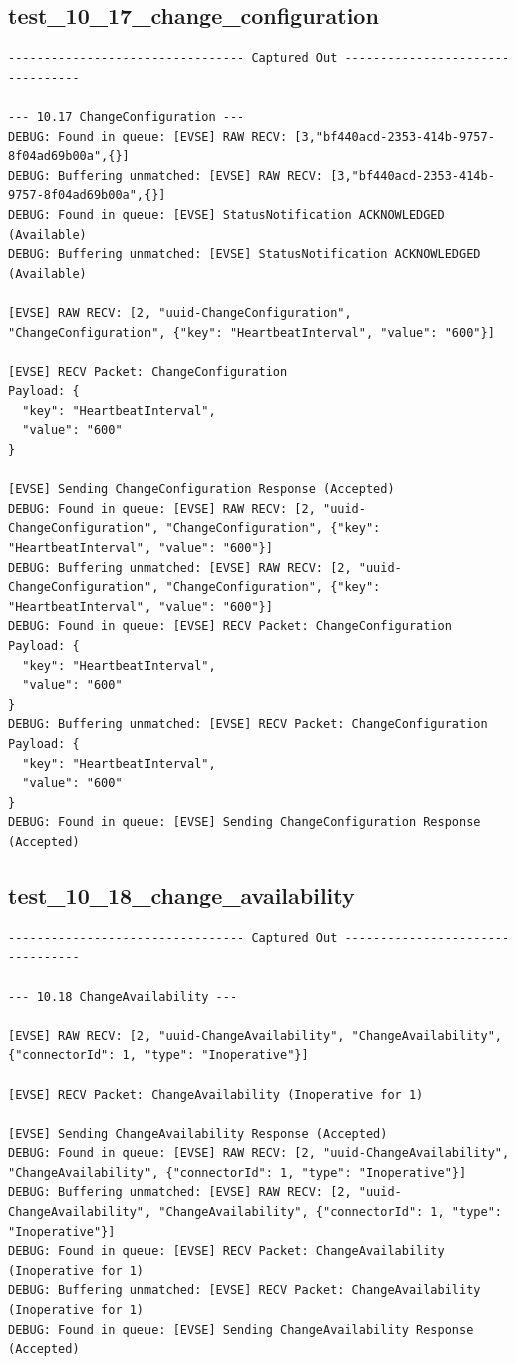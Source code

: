 \documentclass{article}
\begin{document}
\subsection*{test\_10\_17\_change\_configuration}
\begin{lstlisting}
--------------------------------- Captured Out ---------------------------------

--- 10.17 ChangeConfiguration ---
DEBUG: Found in queue: [EVSE] RAW RECV: [3,"bf440acd-2353-414b-9757-8f04ad69b00a",{}]
DEBUG: Buffering unmatched: [EVSE] RAW RECV: [3,"bf440acd-2353-414b-9757-8f04ad69b00a",{}]
DEBUG: Found in queue: [EVSE] StatusNotification ACKNOWLEDGED (Available)
DEBUG: Buffering unmatched: [EVSE] StatusNotification ACKNOWLEDGED (Available)

[EVSE] RAW RECV: [2, "uuid-ChangeConfiguration", "ChangeConfiguration", {"key": "HeartbeatInterval", "value": "600"}]

[EVSE] RECV Packet: ChangeConfiguration
Payload: {
  "key": "HeartbeatInterval",
  "value": "600"
}

[EVSE] Sending ChangeConfiguration Response (Accepted)
DEBUG: Found in queue: [EVSE] RAW RECV: [2, "uuid-ChangeConfiguration", "ChangeConfiguration", {"key": "HeartbeatInterval", "value": "600"}]
DEBUG: Buffering unmatched: [EVSE] RAW RECV: [2, "uuid-ChangeConfiguration", "ChangeConfiguration", {"key": "HeartbeatInterval", "value": "600"}]
DEBUG: Found in queue: [EVSE] RECV Packet: ChangeConfiguration
Payload: {
  "key": "HeartbeatInterval",
  "value": "600"
}
DEBUG: Buffering unmatched: [EVSE] RECV Packet: ChangeConfiguration
Payload: {
  "key": "HeartbeatInterval",
  "value": "600"
}
DEBUG: Found in queue: [EVSE] Sending ChangeConfiguration Response (Accepted)
\end{lstlisting}
\subsection*{test\_10\_18\_change\_availability}
\begin{lstlisting}
--------------------------------- Captured Out ---------------------------------

--- 10.18 ChangeAvailability ---

[EVSE] RAW RECV: [2, "uuid-ChangeAvailability", "ChangeAvailability", {"connectorId": 1, "type": "Inoperative"}]

[EVSE] RECV Packet: ChangeAvailability (Inoperative for 1)

[EVSE] Sending ChangeAvailability Response (Accepted)
DEBUG: Found in queue: [EVSE] RAW RECV: [2, "uuid-ChangeAvailability", "ChangeAvailability", {"connectorId": 1, "type": "Inoperative"}]
DEBUG: Buffering unmatched: [EVSE] RAW RECV: [2, "uuid-ChangeAvailability", "ChangeAvailability", {"connectorId": 1, "type": "Inoperative"}]
DEBUG: Found in queue: [EVSE] RECV Packet: ChangeAvailability (Inoperative for 1)
DEBUG: Buffering unmatched: [EVSE] RECV Packet: ChangeAvailability (Inoperative for 1)
DEBUG: Found in queue: [EVSE] Sending ChangeAvailability Response (Accepted)
\end{lstlisting}
\end{document}
